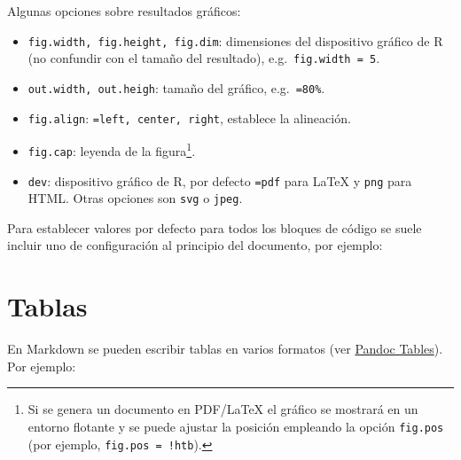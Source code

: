 \documentclass[
]{book}
\newenvironment{Shaded}{\begin{snugshade}}{\end{snugshade}}
\newcommand{\InformationTok}[1]{\textcolor[rgb]{0.56,0.35,0.01}{\textbf{\textit{#1}}}}
\providecommand{\tightlist}{%
  \setlength{\itemsep}{0pt}\setlength{\parskip}{0pt}}
\theoremstyle{break}
\theoremstyle{nonumberplain}
\let\oldfootnote\footnote
\renewcommand\footnote[1]{\oldfootnote{\hspace{2mm}#1}}
\begin{document}
Algunas opciones sobre resultados gráficos:

\begin{itemize}
\tightlist
\item
  \texttt{fig.width,\ fig.height,\ fig.dim}: dimensiones del dispositivo gráfico de R
  (no confundir con el tamaño del resultado), e.g.~\texttt{fig.width\ =\ 5}.
\item
  \texttt{out.width,\ out.heigh}: tamaño del gráfico, e.g.~\texttt{=\textquotesingle{}80\%\textquotesingle{}}.
\item
  \texttt{fig.align}: \texttt{=\textquotesingle{}left\textquotesingle{},\ \textquotesingle{}center\textquotesingle{},\ \textquotesingle{}right\textquotesingle{}}, establece la alineación.
\item
  \texttt{fig.cap}: leyenda de la figura\footnote{Si se genera un documento en PDF/LaTeX el gráfico
    se mostrará en un entorno flotante y se puede ajustar la posición empleando la opción
    \texttt{fig.pos} (por ejemplo, \texttt{fig.pos\ =\ \textquotesingle{}!htb\textquotesingle{}}).}.
\item
  \texttt{dev}: dispositivo gráfico de R, por defecto \texttt{=\textquotesingle{}pdf\textquotesingle{}} para LaTeX y \texttt{\textquotesingle{}png\textquotesingle{}} para HTML.
  Otras opciones son \texttt{\textquotesingle{}svg\textquotesingle{}} o \texttt{\textquotesingle{}jpeg\textquotesingle{}}.
\end{itemize}

Para establecer valores por defecto para todos los bloques de código
se suele incluir uno de configuración al principio del documento, por ejemplo:

\begin{Shaded}
\end{Shaded}

\section{Tablas}\label{tablas}

En Markdown se pueden escribir tablas en varios formatos (ver \href{https://pandoc.org/MANUAL.html\#tables}{Pandoc Tables}).
Por ejemplo:
\end{document}
